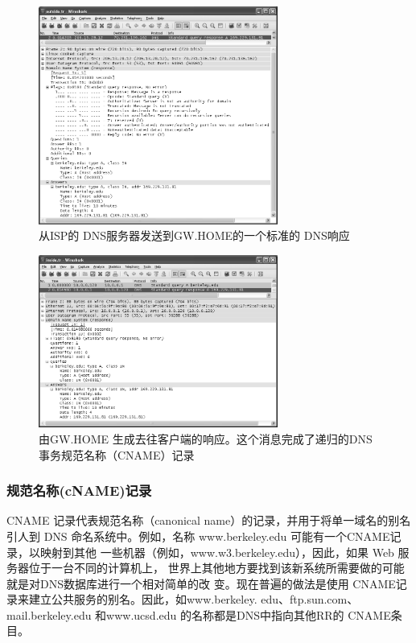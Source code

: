 \begin{figure}[!htb]
    \centering
	\includegraphics[width=0.7\textwidth]{imgs/11/11-12.png}
	\caption{从ISP的 DNS服务器发送到GW.HOME的一个标准的 DNS响应}
\end{figure}

\begin{figure}[!htb]
    \centering
	\includegraphics[width=0.7\textwidth]{imgs/11/11-13.png}
	\caption{由GW.HOME 生成去往客户端的响应。这个消息完成了递归的DNS 事务规范名称（CNAME）记录}
\end{figure}

\subsubsection{规范名称(cNAME)记录}

CNAME 记录代表规范名称（canonical name）的记录，并用于将单一域名的别名引人到
DNS 命名系统中。例如，名称 www.berkeley.edu 可能有一个CNAME记录，以映射到其他
一些机器（例如，www.w3.berkeley.edu），因此，如果 Web 服务器位于一台不同的计算机上，
世界上其他地方要找到该新系统所需要做的可能就是对DNS数据库进行一个相对简单的改
变。现在普遍的做法是使用 CNAME记录来建立公共服务的别名。因此，如www.berkeley.
edu、ftp.sun.com、mail.berkeley.edu 和www.ucsd.edu 的名称都是DNS中指向其他RR的
CNAME条目。

